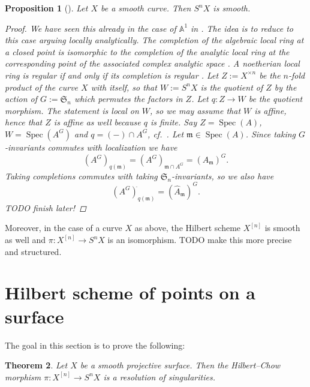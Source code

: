 \documentclass[12pt,a4paper]{amsart}
\theoremstyle{plain}
\newtheorem{thm}{Theorem}[section]
\newtheorem{prop}[thm]{Proposition}
\theoremstyle{definition}
\theoremstyle{remark}
\begin{document}
\begin{prop}[{\cite[Proposition 3.1]{rot16}}]
  Let $X$ be a smooth curve.
  Then $S^{n}X$ is smooth.

  \begin{proof}
    We have seen this already in the case of $\mathbb{A}^{1}$ in .
    The idea is to reduce to this case arguing locally analytically.
    The completion of the algebraic local ring at a closed point is isomorphic to the completion of the analytic local ring at the corresponding point of the associated complex analytic space \cite[Proposition 3]{ser56}.
    A noetherian local ring is regular if and only if its completion is regular \cite[\href{https://stacks.math.columbia.edu/tag/07NY}{Tag 07NY}]{stacks-project}.
    Let $Z := X^{\times n}$ be the $n$-fold product of the curve $X$ with itself, so that $W := S^{n}X$ is the quotient of $Z$ by the action of $G := \mathfrak{S}_{n}$ which permutes the factors in $Z$.
    Let $q \colon Z \to W$ be the quotient morphism.
    The statement is local on $W$, so we may assume that $W$ is affine, hence that $Z$ is affine as well because $q$ is finite.
    Say $Z = \operatorname{Spec}(A)$, $W = \operatorname{Spec}(A^{G})$ and $q = (-) \cap A^{G}$, cf.~.
    Let $\mathfrak{m} \in \operatorname{Spec}(A)$.
    Since taking $G$-invariants commutes with localization \cite[Exercise 5.12]{am69} we have
    \[ (A^{G})_{q(\mathfrak{m})} = (A^{G})_{\mathfrak{m} \cap A^{G}} = (A_{\mathfrak{m}})^{G}. \]
    Taking completions commutes with taking $\mathfrak{S}_{n}$-invariants, so we also have
    \[ (A^{G})_{q(\mathfrak{m})}^{\hat{}} = (\hat{A}_{\mathfrak{m}})^{G}. \]
    \color{red} TODO finish later! \color{black}
  \end{proof}
\end{prop}

Moreover, in the case of a curve $X$ as above, the Hilbert scheme $X^{[n]}$ is smooth as well and $\pi \colon X^{[n]} \to S^{n}X$ is an isomorphism.
\color{red} TODO make this more precise and structured. \color{black}

\section{Hilbert scheme of points on a surface}

The goal in this section is to prove the following:

\begin{thm}\label{thm:resolution}
  Let $X$ be a smooth projective surface.
  Then the Hilbert--Chow morphism $\pi \colon X^{[n]} \to S^{n}X$ is a resolution of singularities.
\end{thm}
\end{document}
